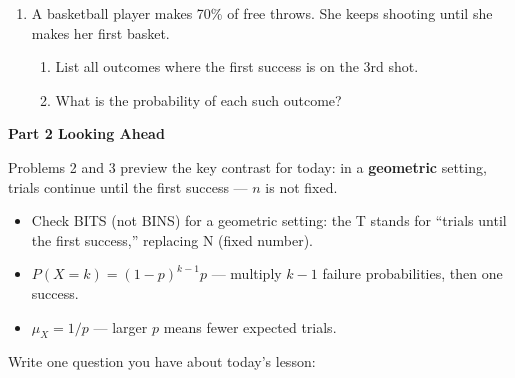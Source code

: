 \documentclass[10pt]{article}
\begin{document}
\begin{enumerate}
    \vspace{0.18in}

    \item A basketball player makes 70\% of free throws. She keeps shooting until
    she makes her first basket.
    \begin{enumerate}[label=(\alph*), itemsep=6pt]
        \item List all outcomes where the first success is on the 3rd shot.\\
        \writeline
        \item What is the probability of each such outcome?\\
        \writeline
    \end{enumerate}

\end{enumerate}

\vspace{0.2in}

{\large\bfseries\color{navy} Part 2 \quad Looking Ahead}

\vspace{0.12in}

\noindent Problems 2 and 3 preview the key contrast for today: in a \textbf{geometric}
setting, trials continue until the first success --- $n$ is not fixed.

\vspace{0.14in}

\begin{tcolorbox}[colback=greenbg, colframe=greenacc, boxrule=0.8pt, arc=2mm,
    left=4mm, right=4mm, top=3mm, bottom=3mm]
    \small
    \begin{itemize}[leftmargin=1.3em, itemsep=8pt]
  \item Check BITS (not BINS) for a geometric setting: the T stands for
        ``trials until the first success,'' replacing N (fixed number).
  \item $P(X = k) = (1-p)^{k-1}p$ --- multiply $k-1$ failure probabilities,
        then one success.
  \item $\mu_X = 1/p$ --- larger $p$ means fewer expected trials.
    \end{itemize}
\end{tcolorbox}

\vspace{0.18in}

\noindent\textcolor{slate}{\small Write one question you have about today's lesson:}\\[8pt]
\writeline\\[2pt]\writeline
\end{document}
